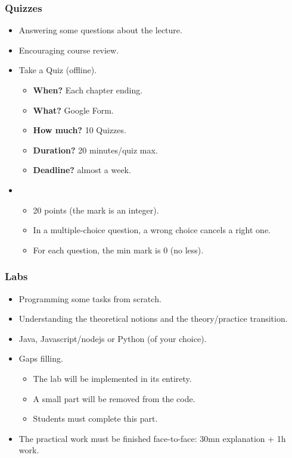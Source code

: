 \documentclass{beamer}
\begin{document}
\begin{frame}
	\frametitle{Quizzes}
	
	\begin{itemize}
		\item Answering some questions about the lecture.
		\item {} Encouraging course review.
		\item {} Take a Quiz (offline).
		\begin{itemize}
			\item \textbf{When?} Each chapter ending.
			\item \textbf{What?} Google Form.
			\item \textbf{How much?} 10 Quizzes.
			\item \textbf{Duration?} 20 minutes/quiz max.
			\item \textbf{Deadline?} almost a week.
		\end{itemize}
		\item {}
		\begin{itemize}
			\item 20 points (the mark is an integer).
			\item In a multiple-choice question, a wrong choice cancels a right one.
			\item For each question, the min mark is 0 (no less).
		\end{itemize}
	\end{itemize}
	
\end{frame}

\begin{frame}
	\frametitle{Labs}
	
	\begin{itemize}
		\item Programming some tasks from scratch.
		\item {} Understanding the theoretical notions and the theory/practice transition.
		\item {} Java, Javascript/nodejs or Python (of your choice).
		\item {} Gaps filling.
		\begin{itemize}
			\item The lab will be implemented in its entirety.
			\item A small part will be removed from the code.
			\item Students must complete this part.
		\end{itemize}
		\item The practical work must be finished face-to-face: 30mn explanation + 1h work.
	\end{itemize}
	
\end{frame}
\end{document}
